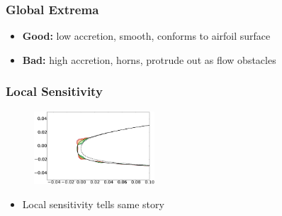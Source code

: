 \documentclass[9pt]{beamer}
\begin{document}
\begin{frame}
\frametitle{Global Extrema}
\label{sec-4-5}

\vspace*{-0.0cm}\begin{figure}
\end{figure}
\begin{itemize}
\item \textbf{Good:} low accretion, smooth, conforms to airfoil surface
\item \textbf{Bad:} high accretion, horns, protrude out as flow obstacles
\end{itemize}
\end{frame}
\begin{frame}
\frametitle{Local Sensitivity}
\label{sec-4-6}

\vspace*{-0.0cm}\begin{figure}
      \includegraphics[width=0.4\textwidth]{LocalSensitivityCL}
\end{figure}
\begin{itemize}
\item Local sensitivity tells same story
\end{itemize}
\end{frame}
\end{document}
